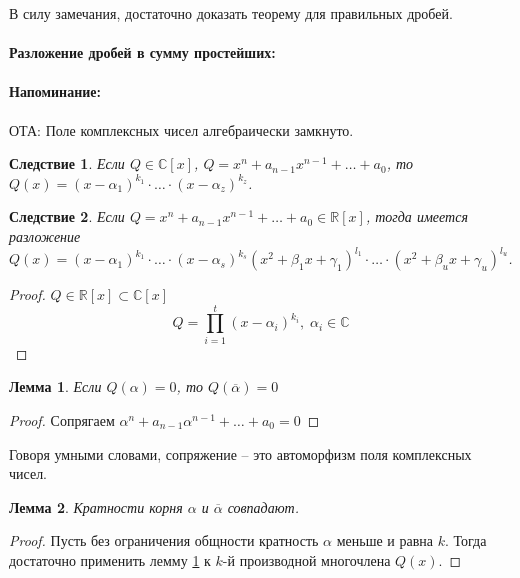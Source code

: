 \documentclass{article}
\theoremstyle{plain}
\newtheorem{lemma}{Лемма}
\newtheorem{corollary}{Следствие}
\theoremstyle{definition}
\theoremstyle{remark}
\begin{document}
В силу замечания, достаточно доказать теорему для правильных дробей.
\paragraph{Разложение дробей в сумму простейших:} 
\paragraph{Напоминание:} ОТА: Поле комплексных чисел алгебраически замкнуто.
\begin{corollary}
Если $Q\in \mathbb{C}[x]$, $Q=x^n + a_{n-1}x^{n-1} + \ldots + a_0$, то $Q(x) = (x-\alpha_1)^{k_1}\cdot \ldots \cdot (x-\alpha_z)^{k_z}$.
\end{corollary} 

\begin{corollary} Если $Q=x^n + a_{n-1}x^{n-1} + \ldots + a_0 \in \mathbb{R}[x]$, тогда имеется разложение $Q(x) = (x-\alpha_1)^{k_1}\cdot \ldots \cdot (x-\alpha_s)^{k_s}(x^2+\beta_1x+\gamma_1)^{l_1} \cdot \ldots \cdot (x^2+\beta_{u}x+\gamma_{u})^{l_{u}}$. \end{corollary} 

\begin{proof}
$Q \in \mathbb{R}[x] \subset \mathbb{C}[x]$
$$Q = \prod_{i = 1}^{t}(x - \alpha_i)^{k_i},\;\alpha_i \in \mathbb{C}$$
\end{proof}

\begin{lemma}\label{l:conj}
Если $Q(\alpha) = 0$, то $Q(\overline{\alpha}) = 0$
\end{lemma}

\begin{proof}
Сопрягаем  $\alpha^n + a_{n-1}\alpha^{n-1} + \ldots + a_0 = 0$
\end{proof}

Говоря умными словами, сопряжение -- это автоморфизм поля комплексных чисел.

\begin{lemma}
Кратности корня $\alpha$ и $\overline{\alpha}$ совпадают.
\end{lemma}

\begin{proof}
Пусть без ограничения общности кратность $\alpha$ меньше и равна $k$.
Тогда достаточно применить лемму \ref{l:conj} к $k$-й производной многочлена $Q(x)$.
\end{proof}
\end{document}
